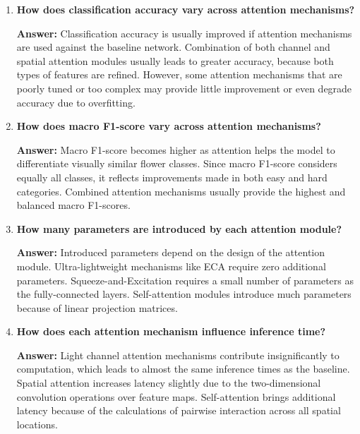 \documentclass[10pt]{article}
\begin{document}
\begin{enumerate}

\item \textbf{How does classification accuracy vary across attention mechanisms?}

\textbf{Answer:} Classification accuracy is usually improved if attention mechanisms are used against the baseline network. Combination of both channel and spatial attention modules usually leads to greater accuracy, because both types of features are refined. However, some attention mechanisms that are poorly tuned or too complex may provide little improvement or even degrade accuracy due to overfitting.

\vspace{5mm}

\item \textbf{How does macro F1-score vary across attention mechanisms?}

\textbf{Answer:}  Macro F1-score becomes higher as attention helps the model to differentiate visually similar flower classes. Since macro F1-score considers equally all classes, it reflects improvements made in both easy and hard categories. Combined attention mechanisms usually provide the highest and balanced macro F1-scores.

\vspace{5mm}

\item \textbf{How many parameters are introduced by each attention module?}

\textbf{Answer:} Introduced parameters depend on the design of the attention module. Ultra-lightweight mechanisms like ECA require zero additional parameters. Squeeze-and-Excitation requires a small number of parameters as the fully-connected layers. Self-attention modules introduce much parameters because of linear projection matrices.

\vspace{5mm}

\item \textbf{How does each attention mechanism influence inference time?}

\textbf{Answer:} Light channel attention mechanisms contribute insignificantly to computation, which leads to almost the same inference times as the baseline. Spatial attention increases latency slightly due to the two-dimensional convolution operations over feature maps. Self-attention brings additional latency because of the calculations of pairwise interaction across all spatial locations.


\end{enumerate}
\end{document}
